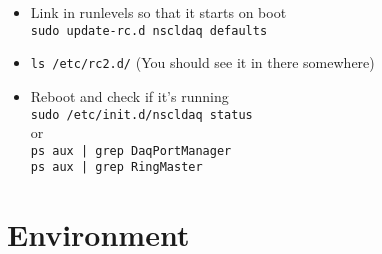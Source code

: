 \documentclass[11pt]{article}
\begin{document}
\begin{itemize}
\item Link in runlevels so that it starts on boot\\
    \verb~sudo update-rc.d nscldaq defaults~
\item \verb~ls /etc/rc2.d/~ (You should see it in there somewhere)
\item Reboot and check if it's running\\
    \verb~sudo /etc/init.d/nscldaq status~\\
    or\\
    \verb~ps aux | grep DaqPortManager~\\
    \verb~ps aux | grep RingMaster~
\end{itemize}

\section*{Environment}
\label{sec-7}
\end{document}
